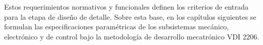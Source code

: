 Estos requerimientos normativos y funcionales definen los criterios de entrada para la etapa de diseño de detalle. Sobre esta base, en los capítulos siguientes se formulan las especificaciones paramétricas de los subsistemas mecánico, electrónico y de control bajo la metodología de desarrollo mecatrónico VDI 2206.

